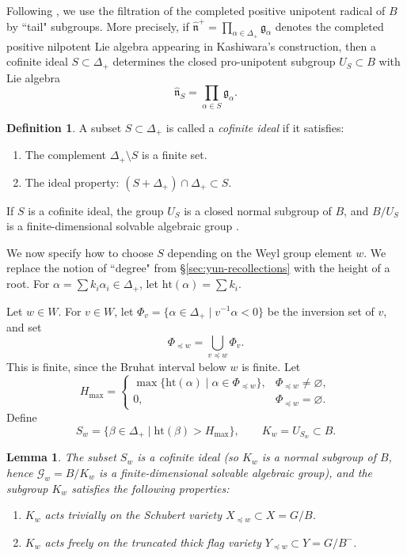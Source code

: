 \documentclass{amsart}
\newtheorem{Lem}[Thm]{Lemma}
\theoremstyle{definition}
\newtheorem{defi}[Thm]{Definition}
\numberwithin{equation}{section}
\begin{document}
Following \cite[\S 5]{K}, we use the filtration of the completed positive
unipotent radical of $B$ by ``tail" subgroups. More precisely, if
$\widehat{\mathfrak n}^+=\prod_{\alpha\in\Delta_+}\mathfrak g_\alpha$ denotes the completed
positive nilpotent Lie algebra appearing in Kashiwara's construction, then a cofinite
ideal $S\subset\Delta_+$ determines the closed pro-unipotent subgroup
$U_S\subset B$ with Lie algebra
\[
\widehat{\mathfrak n}_S=\prod_{\alpha\in S}\mathfrak g_\alpha .
\]

\begin{defi}
A subset $S \subset \Delta_+$ is called a \emph{cofinite ideal} if it satisfies:
\begin{enumerate}
    \item The complement $\Delta_+ \setminus S$ is a finite set.
    \item The ideal property: $(S + \Delta_+) \cap \Delta_+ \subset S$.
\end{enumerate}
If $S$ is a cofinite ideal, the group $U_S$ is a closed normal subgroup of $B$, and
$B/U_S$ is a finite-dimensional solvable algebraic group \cite[\S 3.4, pp.~171--172]{K}.
\end{defi}

We now specify how to choose $S$ depending on the Weyl group element $w$. We replace the notion of ``degree" from \S\ref{sec:yun-recollections} with
the height of a root. For $\alpha = \sum k_i \alpha_i \in \Delta_+$, let
$\mathrm{ht}(\alpha) = \sum k_i$.

Let $w \in W$. For $v\in W$, let
$\Phi_v = \{ \alpha \in \Delta_+ \mid v^{-1}\alpha < 0 \}$ be the inversion set of $v$, and set
\[
\Phi_{\preceq w}=\bigcup_{v\preceq w}\Phi_v .
\]
This is finite, since the Bruhat interval below $w$ is finite. Let
\[
H_{\mathrm{max}} =
\begin{cases}
\max \{ \mathrm{ht}(\alpha) \mid \alpha \in \Phi_{\preceq w} \}, & \Phi_{\preceq w}\ne\varnothing,\\
0, & \Phi_{\preceq w}=\varnothing .
\end{cases}
\]
Define
\[
S_w = \{ \beta \in \Delta_+ \mid \mathrm{ht}(\beta) > H_{\mathrm{max}} \},
\qquad
K_w = U_{S_w}\subset B.
\]

\begin{Lem}\label{lem:Kw}
The subset $S_w$ is a cofinite ideal (so $K_w$ is a normal subgroup of $B$, hence $\mathcal{G}_w=B/K_w$ is a
finite-dimensional solvable algebraic group), and the subgroup $K_w$ satisfies the following properties:
\begin{enumerate}
    \item $K_w$ acts trivially on the Schubert variety $X_{\preceq w} \subset X=G/B$.
    \item $K_w$ acts freely on the truncated thick flag variety $Y_{\preceq w} \subset Y=G/B^-$.
\end{enumerate}
\end{Lem}
\end{document}
